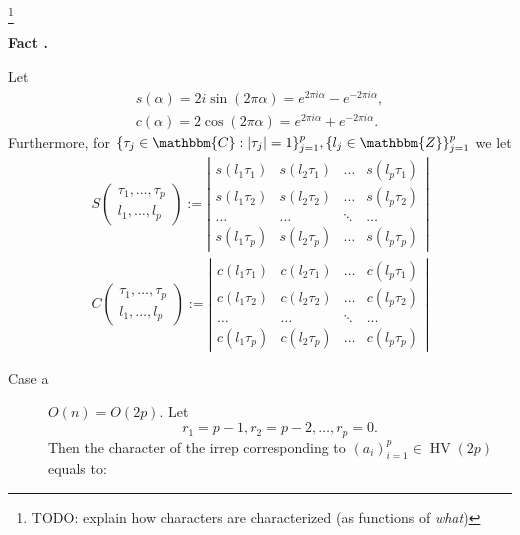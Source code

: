 \documentclass{article}
\newcommand{\assign}{:=}
\newcommand{\tmop}[1]{\ensuremath{\operatorname{#1}}}
\newcommand{\tmtextbf}[1]{{\bfseries{#1}}}
\newcommand{\tmtextit}[1]{{\itshape{#1}}}
\newcommand{\tmtextup}[1]{{\upshape{#1}}}
\begin{document}
\footnote{TODO: explain how characters are characterized (as functions of
\tmtextit{what})}

{\noindent}\tmtextbf{Fact \tmtextup{6}.
}\tmtextit{{\cite[{\textsection}VII.10]{boerner1963representations}} Let
\begin{eqnarray}
  & s (\alpha) = 2 i \sin (2 \pi \alpha) = e^{2 \pi i \alpha} - e^{- 2 \pi i
  \alpha}, &  \nonumber\\
  & c (\alpha) = 2 \cos (2 \pi \alpha) = e^{2 \pi i \alpha} + e^{- 2 \pi i
  \alpha} . &  \nonumber
\end{eqnarray}
Furthermore, for $\{ \tau_j \in \mathbbm{C}: | \tau_j | = 1 \}_{j = 1}^p, \{
l_j \in \mathbbm{Z} \}_{j = 1}^p$ we let
\begin{eqnarray}
  & S \left( \begin{array}{c}
    \tau_1, \ldots, \tau_p\\
    l_1, \ldots, l_p
  \end{array} \right) \assign \left| \begin{array}{cccc}
    s (l_1 \tau_1) & s (l_2 \tau_1) & \ldots & s (l_p \tau_1)\\
    s (l_1 \tau_2) & s (l_2 \tau_2) & \ldots & s (l_p \tau_2)\\
    \ldots & \ldots & \ddots & \ldots\\
    s (l_1 \tau_p) & s (l_2 \tau_p) & \ldots & s (l_p \tau_p)
  \end{array} \right| &  \nonumber\\
  & C \left( \begin{array}{c}
    \tau_1, \ldots, \tau_p\\
    l_1, \ldots, l_p
  \end{array} \right) \assign \left| \begin{array}{cccc}
    c (l_1 \tau_1) & c (l_2 \tau_1) & \ldots & c (l_p \tau_1)\\
    c (l_1 \tau_2) & c (l_2 \tau_2) & \ldots & c (l_p \tau_2)\\
    \ldots & \ldots & \ddots & \ldots\\
    c (l_1 \tau_p) & c (l_2 \tau_p) & \ldots & c (l_p \tau_p)
  \end{array} \right| &  \nonumber
\end{eqnarray}
\begin{description}
  \item[Case a] $O (n) = O (2 p)$. Let
  \[ r_1 = p - 1, r_2 = p - 2, \ldots, r_p = 0. \]
  Then the character of the irrep corresponding to $(a_i)_{i = 1}^p \in
  \tmop{HV} (2 p)$ equals to:

\end{description}}
\end{document}

